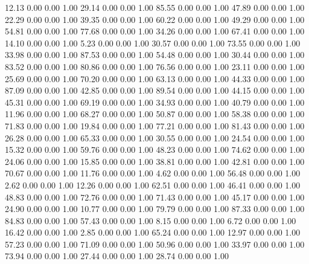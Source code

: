    12.13   0.00   0.00   1.00
   29.14   0.00   0.00   1.00
   85.55   0.00   0.00   1.00
   47.89   0.00   0.00   1.00
   22.29   0.00   0.00   1.00
   39.35   0.00   0.00   1.00
   60.22   0.00   0.00   1.00
   49.29   0.00   0.00   1.00
   54.81   0.00   0.00   1.00
   77.68   0.00   0.00   1.00
   34.26   0.00   0.00   1.00
   67.41   0.00   0.00   1.00
   14.10   0.00   0.00   1.00
    5.23   0.00   0.00   1.00
   30.57   0.00   0.00   1.00
   73.55   0.00   0.00   1.00
   33.98   0.00   0.00   1.00
   87.53   0.00   0.00   1.00
   54.48   0.00   0.00   1.00
   30.44   0.00   0.00   1.00
   83.52   0.00   0.00   1.00
   80.86   0.00   0.00   1.00
   76.56   0.00   0.00   1.00
   23.11   0.00   0.00   1.00
   25.69   0.00   0.00   1.00
   70.20   0.00   0.00   1.00
   63.13   0.00   0.00   1.00
   44.33   0.00   0.00   1.00
   87.09   0.00   0.00   1.00
   42.85   0.00   0.00   1.00
   89.54   0.00   0.00   1.00
   44.15   0.00   0.00   1.00
   45.31   0.00   0.00   1.00
   69.19   0.00   0.00   1.00
   34.93   0.00   0.00   1.00
   40.79   0.00   0.00   1.00
   11.96   0.00   0.00   1.00
   68.27   0.00   0.00   1.00
   50.87   0.00   0.00   1.00
   58.38   0.00   0.00   1.00
   71.83   0.00   0.00   1.00
   19.84   0.00   0.00   1.00
   77.21   0.00   0.00   1.00
   81.43   0.00   0.00   1.00
   26.28   0.00   0.00   1.00
   65.33   0.00   0.00   1.00
   30.55   0.00   0.00   1.00
   24.54   0.00   0.00   1.00
   15.32   0.00   0.00   1.00
   59.76   0.00   0.00   1.00
   48.23   0.00   0.00   1.00
   74.62   0.00   0.00   1.00
   24.06   0.00   0.00   1.00
   15.85   0.00   0.00   1.00
   38.81   0.00   0.00   1.00
   42.81   0.00   0.00   1.00
   70.67   0.00   0.00   1.00
   11.76   0.00   0.00   1.00
    4.62   0.00   0.00   1.00
   56.48   0.00   0.00   1.00
    2.62   0.00   0.00   1.00
   12.26   0.00   0.00   1.00
   62.51   0.00   0.00   1.00
   46.41   0.00   0.00   1.00
   48.83   0.00   0.00   1.00
   72.76   0.00   0.00   1.00
   71.43   0.00   0.00   1.00
   45.17   0.00   0.00   1.00
   24.90   0.00   0.00   1.00
   10.77   0.00   0.00   1.00
   79.79   0.00   0.00   1.00
   87.33   0.00   0.00   1.00
   84.83   0.00   0.00   1.00
   57.43   0.00   0.00   1.00
    8.15   0.00   0.00   1.00
    6.72   0.00   0.00   1.00
   16.42   0.00   0.00   1.00
    2.85   0.00   0.00   1.00
   65.24   0.00   0.00   1.00
   12.97   0.00   0.00   1.00
   57.23   0.00   0.00   1.00
   71.09   0.00   0.00   1.00
   50.96   0.00   0.00   1.00
   33.97   0.00   0.00   1.00
   73.94   0.00   0.00   1.00
   27.44   0.00   0.00   1.00
   28.74   0.00   0.00   1.00
